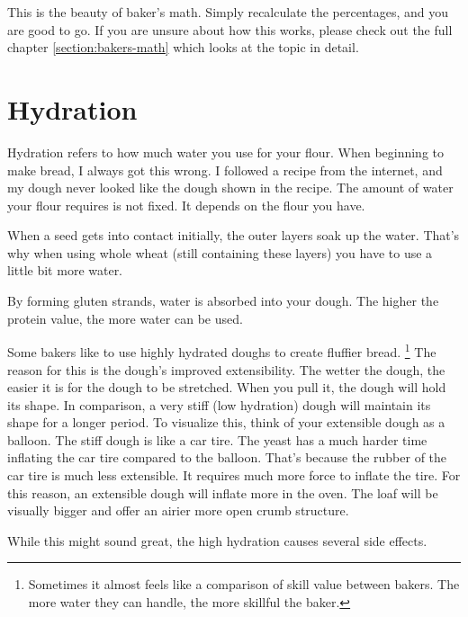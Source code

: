 This is the beauty of baker's math. Simply recalculate the percentages, and you
are good to go. If you are unsure about how this works, please check out the
full chapter \ref{section:bakers-math} which looks at the topic in detail.

\section{Hydration}

Hydration refers to how much water you use for your flour. When
beginning to make bread, I always got this wrong. I followed a recipe from the
internet, and my dough never looked like the dough shown in the recipe.
The amount of water your flour requires is not fixed. It depends on the flour
you have.

When a seed gets into contact initially, the outer layers soak up the water.
That's why when using whole wheat (still containing these layers) you have to
use a little bit more water.

By forming gluten strands, water is absorbed into your dough. The higher the
protein value, the more water can be used.

Some bakers like to use highly hydrated doughs to create fluffier bread.
\footnote{Sometimes it almost feels like a comparison of skill value between bakers. The
more water they can handle, the more skillful the baker.} The reason for this
is the dough's improved extensibility. The wetter the dough, the easier it is
for the dough to be stretched. When you pull it, the dough will hold its
shape. In comparison, a very stiff (low hydration) dough will maintain its
shape for a longer period. To visualize this, think of your extensible
dough as a balloon. The stiff dough is like a car tire.
The yeast has a much harder time inflating the car tire compared to the balloon.
That’s because the rubber of the car tire is much less extensible.
It requires much more force to inflate the tire. For this reason,
an extensible dough will inflate more in the oven. The loaf will
be visually bigger and offer an airier more open crumb structure.

While this might sound great, the high hydration causes several side effects.

